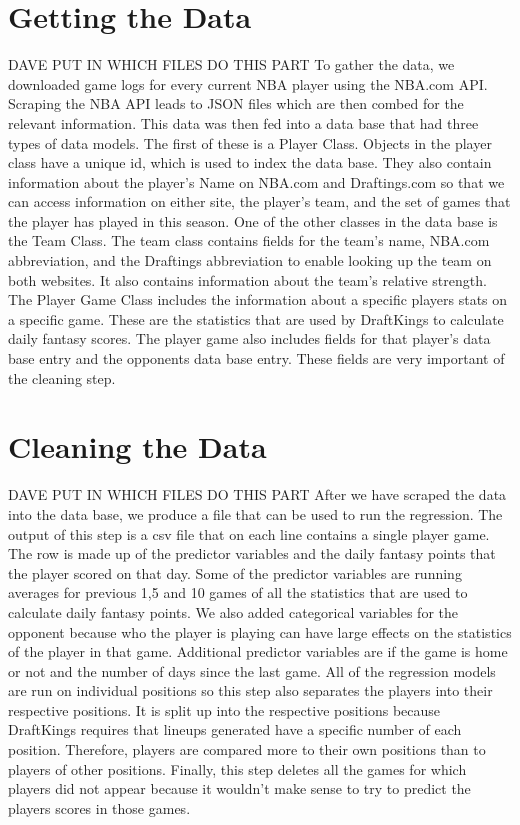 \documentclass[12pt]{article}
\renewcommand{\=}[1]{\stackrel{#1}{=}} %
\theoremstyle{definition}
\begin{document}
\section{Getting the Data} 
\label{da}
DAVE PUT IN WHICH FILES DO THIS PART 
To gather the data, we downloaded game logs for every current NBA player using the NBA.com API. Scraping the NBA API leads to JSON files which are then combed for the relevant information. This data was then fed into a data base that had three types of data models. The first of these is a Player Class. Objects in the player class have a unique id, which is used to index the data base. They also contain information about the player's Name on NBA.com and Draftings.com so that we can access information on either site, the player's team, and the set of games that the player has played in this season. One of the other classes in the data base is the Team Class. The team class contains fields for the team's name, NBA.com abbreviation, and the Draftings abbreviation to enable looking up the team on both websites. It also contains information about the team's relative strength. The Player Game Class includes the information about a specific players stats on a specific game. These are the statistics that are used by DraftKings to calculate daily fantasy scores. The player game also includes fields for that player's data base entry and the opponents data base entry. These fields are very important of the cleaning step. 

\section{Cleaning the Data} 
\label{cl}
DAVE PUT IN WHICH FILES DO THIS PART 
After we have scraped the data into the data base, we produce a file that can be used to run the regression. The output of this step is a csv file that on each line contains a single player game. The row is made up of the predictor variables and the daily fantasy points that the player scored on that day. Some of the predictor variables are running averages for previous 1,5 and 10 games of all the statistics that are used to calculate daily fantasy points. We also added categorical variables for the opponent because who the player is playing can have large effects on the statistics of the player in that game. Additional predictor variables are if the game is home or not and the number of days since the last game. All of the regression models are run on individual positions so this step also separates the players into their respective positions. It is split up into the respective positions because DraftKings requires that lineups generated have a specific number of each position. Therefore, players are compared more to their own positions than to players of other positions. Finally, this step deletes all the games for which players did not appear because it wouldn't make sense to try to predict the players scores in those games. 
\end{document}
